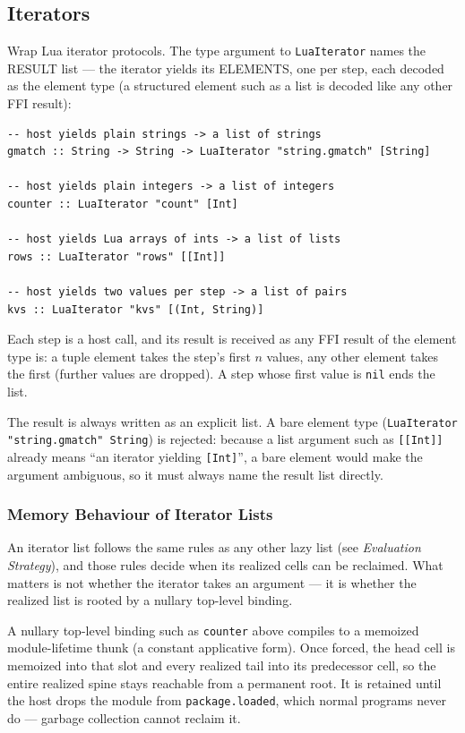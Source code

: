 \documentclass[11pt,a4paper]{article}
\begin{document}
\subsection{Iterators}

Wrap Lua iterator protocols. The type argument to \texttt{LuaIterator}
names the RESULT list --- the iterator yields its ELEMENTS, one per
step, each decoded as the element type (a structured element such as a
list is decoded like any other FFI result):

\begin{lstlisting}
-- host yields plain strings -> a list of strings
gmatch :: String -> String -> LuaIterator "string.gmatch" [String]

-- host yields plain integers -> a list of integers
counter :: LuaIterator "count" [Int]

-- host yields Lua arrays of ints -> a list of lists
rows :: LuaIterator "rows" [[Int]]

-- host yields two values per step -> a list of pairs
kvs :: LuaIterator "kvs" [(Int, String)]
\end{lstlisting}

Each step is a host call, and its result is received as any FFI result
of the element type is: a tuple element takes the step's first $n$
values, any other element takes the first (further values are dropped).
A step whose first value is \texttt{nil} ends the list.

The result is always written as an explicit list. A bare element type
(\texttt{LuaIterator "string.gmatch" String}) is rejected: because a
list argument such as \texttt{[[Int]]} already means ``an iterator
yielding \texttt{[Int]}'', a bare element would make the argument
ambiguous, so it must always name the result list directly.

\subsubsection{Memory Behaviour of Iterator Lists}

An iterator list follows the same rules as any other lazy list (see
\emph{Evaluation Strategy}), and those rules decide when its realized
cells can be reclaimed.  What matters is not whether the iterator
takes an argument --- it is whether the realized list is rooted by a
nullary top-level binding.

A nullary top-level binding such as \texttt{counter} above compiles to
a memoized module-lifetime thunk (a constant applicative form).  Once
forced, the head cell is memoized into that slot and every realized
tail into its predecessor cell, so the entire realized spine stays
reachable from a permanent root.  It is retained until the host drops
the module from \texttt{package.loaded}, which normal programs never
do --- garbage collection cannot reclaim it.
\end{document}
